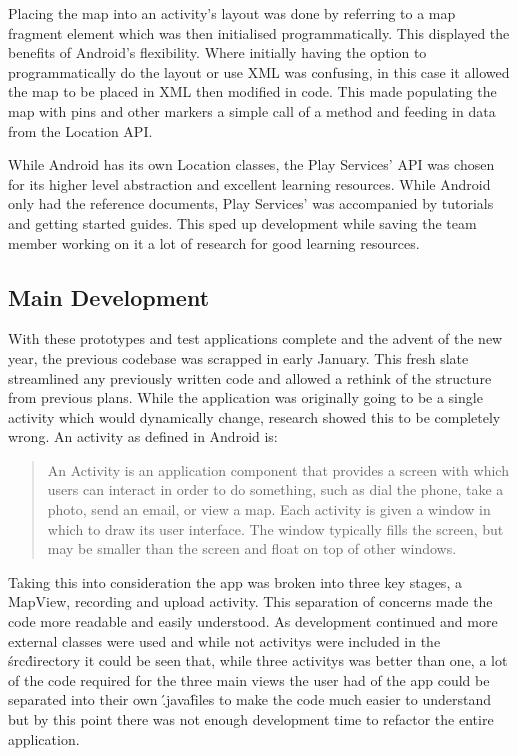 \documentclass{l3proj}
\begin{document}
Placing the map into an activity's layout was done by referring to a map fragment element which was then initialised programmatically. This displayed the benefits of Android's flexibility. Where initially having the option to programmatically do the layout or use XML was confusing, in this case it allowed the map to be placed in XML then modified in code. This made populating the map with pins and other markers a simple call of a method and feeding in data from the Location API.

While Android has its own Location classes, the Play Services' API was chosen for its higher level abstraction and excellent learning resources. While Android only had the reference documents, Play Services' was accompanied by tutorials and getting started guides. This sped up development while saving the team member working on it a lot of research for good learning resources.

\subsection{Main Development}
With these prototypes and test applications complete and the advent of the new year, the previous codebase was scrapped in early January. This fresh slate streamlined any previously written code and allowed a rethink of the structure from previous plans. While the application was originally going to be a single activity which would dynamically change, research showed this to be completely wrong. An activity as defined in Android is:

\blockquote{An Activity is an application component that provides a screen with which users can interact in order to do something, such as dial the phone, take a photo, send an email, or view a map. Each activity is given a window in which to draw its user interface. The window typically fills the screen, but may be smaller than the screen and float on top of other windows.}

Taking this into consideration the app was broken into three key stages, a MapView, recording and upload activity. This separation of concerns made the code more readable and easily understood. As development continued and more external classes were used and while not activitys were included in the \'src\' directory it could be seen that, while three activitys was better than one, a lot of the code required for the three main views the user had of the app could be separated into their own \'.java\' files to make the code much easier to understand but by this point there was not enough development time to refactor the entire application.
\end{document}
